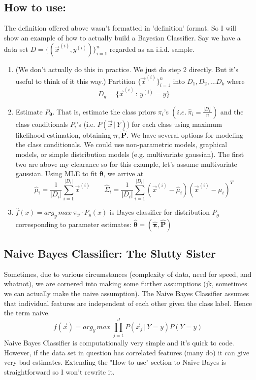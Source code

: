 \documentclass[10pt]{article}
\begin{document}
	\subsection*{How to use:}
		The definition offered above wasn't formatted in 'definition' format. So I will show an example of how 
		to actually build a Bayesian Classifier. Say we have
		a data set $D = \{ (\vec x^{(i)}, y^{(i)})\}_{i=1}^n$ regarded as an i.i.d. sample.
		\begin{enumerate}
			\item (We don't actually do this in practice. We just do step 2 directly. But it's useful to think of it this way.) 
				Partition $\{\vec x^{(i)}\}_{i=1}^{n}$ into $D_1, D_2, ... D_k$ where
				$$ D_y = \{\vec x^{(i)} \, : \, y^{(i)} = y\}$$
			\item Estimate $P_{\pmb \theta}$. That is, estimate the class priors $\pi_i$'s 
				$ (i.e. \ \hat \pi_i = \frac{|D_i|}{n})$ and the class conditionals
				$P_i$'s (i.e. $P(\vec x \, | \, Y)$) for each class using maximum likelihood estimation,
				obtaining $\hat{\pmb{\pi}}, \hat{\pmb{P}}$. We have several options for modeling the class conditionals. 
				We could use non-parametric models, graphical models, or simple distribution models (e.g. multivariate
				gaussian). The first two are above my clearance so for this example, let's assume multivariate gaussian. 
				Using MLE to fit $\pmb \theta$, we arrive at 
				$$ \hat{\mu}_i = \frac{1}{|D_i|}\sum_{i=1}^{|D_i|} \vec x^{(i)} \quad \quad
				\hat{\Sigma}_i = \frac{1}{|D_i|}\sum_{i=1}^{|D_i|} (\vec x^{(i)} - \hat \mu_i)(\vec x^{(i)} - \hat \mu_i)^T $$
			\item  $ \hat{f}(x) = arg_y \, max \ \pi_y \cdot P_y(x)$ is Bayes classifier for distribution $P_{\hat \theta}$ 
				corresponding to parameter estimates: $ \hat{\pmb{\theta}} = (\hat{\pmb{\pi}}, \hat{\pmb{P}}) $
		\end{enumerate}	
		
	\subsection*{Naive Bayes Classifier: The Slutty Sister}
		Sometimes, due to various circumstances (complexity of data, need for speed, and whatnot), we are 
		cornered into making some further assumptions (jk, sometimes we can actually make the naive
		assumption). The Naive Bayes Classifier assumes that individual features 
		are independent of each other given the class label. Hence the term naive. 
		$$ f(\vec x) =  arg_y \, max \ \prod_{j=1}^{d}P(\vec x_j \, | \, Y=y)P(Y = y)$$
		Naive Bayes Classifier is computationally very simple and it's quick to code. However, if the data
		set in question has correlated features (many do) it can give very bad estimates. Extending the
		"How to use" section to Naive Bayes is straightforward so I won't rewrite it. \\
\end{document}

